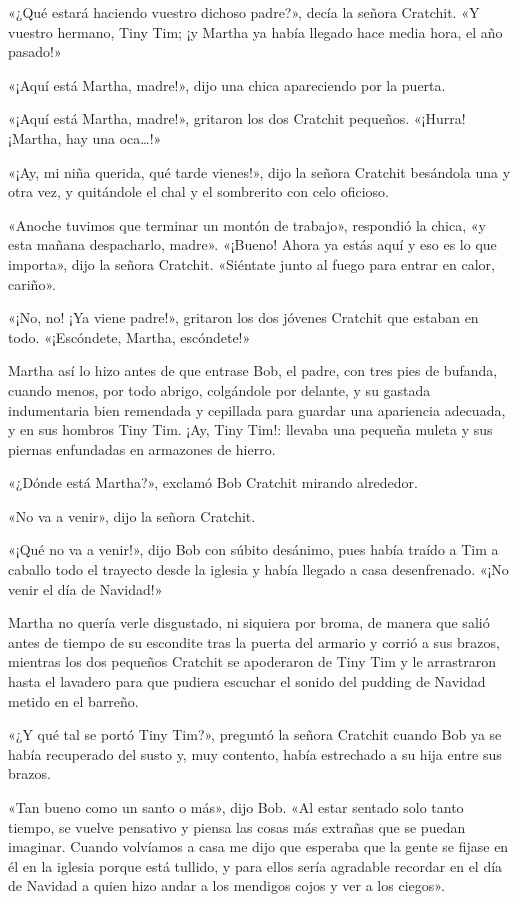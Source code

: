 \documentclass{novela}
\begin{document}
 «¿Qué estará haciendo vuestro dichoso padre?», decía la señora Cratchit. «Y vuestro hermano, Tiny Tim; ¡y Martha ya había llegado hace media hora, el año pasado!»

 «¡Aquí está Martha, madre!», dijo una chica apareciendo por la puerta.

 «¡Aquí está Martha, madre!», gritaron los dos Cratchit pequeños. «¡Hurra! ¡Martha, hay una oca{\ldots}!»

 «¡Ay, mi niña querida, qué tarde vienes!», dijo la señora Cratchit besándola una y otra vez, y quitándole el chal y el sombrerito con celo oficioso.

 «Anoche tuvimos que terminar un montón de trabajo», respondió la chica, «y esta mañana despacharlo, madre». «¡Bueno! Ahora ya estás aquí y eso es lo que importa», dijo la señora Cratchit. «Siéntate junto al fuego para entrar en calor, cariño».

 «¡No, no! ¡Ya viene padre!», gritaron los dos jóvenes Cratchit que estaban en todo. «¡Escóndete, Martha, escóndete!»

 Martha así lo hizo antes de que entrase Bob, el padre, con tres pies de bufanda, cuando menos, por todo abrigo, colgándole por delante, y su gastada indumentaria bien remendada y cepillada para guardar una apariencia adecuada, y en sus hombros Tiny Tim. ¡Ay, Tiny Tim!: llevaba una pequeña muleta y sus piernas enfundadas en armazones de hierro.

 «¿Dónde está Martha?», exclamó Bob Cratchit mirando alrededor.

 «No va a venir», dijo la señora Cratchit.

 «¡Qué no va a venir!», dijo Bob con súbito desánimo, pues había traído a Tim a caballo todo el trayecto desde la iglesia y había llegado a casa desenfrenado. «¡No venir el día de Navidad!»

 Martha no quería verle disgustado, ni siquiera por broma, de manera que salió antes de tiempo de su escondite tras la puerta del armario y corrió a sus brazos, mientras los dos pequeños Cratchit se apoderaron de Tiny Tim y le arrastraron hasta el lavadero para que pudiera escuchar el sonido del pudding de Navidad metido en el barreño.

 «¿Y qué tal se portó Tiny Tim?», preguntó la señora Cratchit cuando Bob ya se había recuperado del susto y, muy contento, había estrechado a su hija entre sus brazos.

 «Tan bueno como un santo o más», dijo Bob. «Al estar sentado solo tanto tiempo, se vuelve pensativo y piensa las cosas más extrañas que se puedan imaginar. Cuando volvíamos a casa me dijo que esperaba que la gente se fijase en él en la iglesia porque está tullido, y para ellos sería agradable recordar en el día de Navidad a quien hizo andar a los mendigos cojos y ver a los ciegos».
\end{document}
